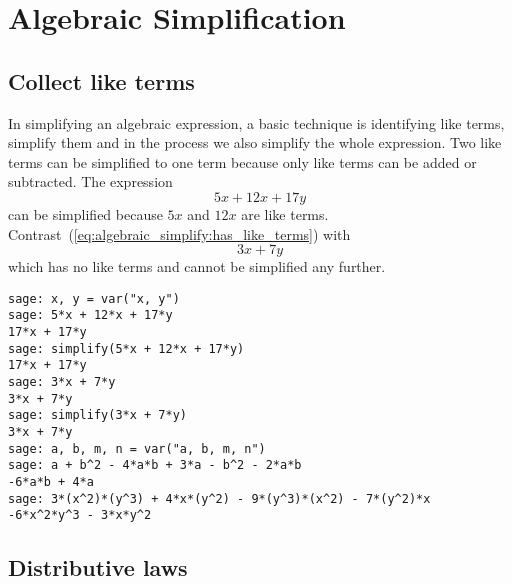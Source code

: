 
\chapter{Algebraic Simplification}



\section{Collect like terms}

In simplifying an algebraic expression, a basic technique is
identifying like terms, simplify them and in the
process we also simplify the whole expression. Two like terms can be
simplified to one term because only like terms can be added or
subtracted. The expression
%
\begin{equation}
\label{eq:algebraic_simplify:has_like_terms}
5x + 12x + 17y
\end{equation}
%
can be simplified because $5x$ and $12x$ are like
terms. Contrast~(\ref{eq:algebraic_simplify:has_like_terms}) with
\[
3x + 7y
\]
which has no like terms and cannot be simplified any further.

\begin{lstlisting}
sage: x, y = var("x, y")
sage: 5*x + 12*x + 17*y
17*x + 17*y
sage: simplify(5*x + 12*x + 17*y)
17*x + 17*y
sage: 3*x + 7*y
3*x + 7*y
sage: simplify(3*x + 7*y)
3*x + 7*y
sage: a, b, m, n = var("a, b, m, n")
sage: a + b^2 - 4*a*b + 3*a - b^2 - 2*a*b
-6*a*b + 4*a
sage: 3*(x^2)*(y^3) + 4*x*(y^2) - 9*(y^3)*(x^2) - 7*(y^2)*x
-6*x^2*y^3 - 3*x*y^2
\end{lstlisting}



\section{Distributive laws}

